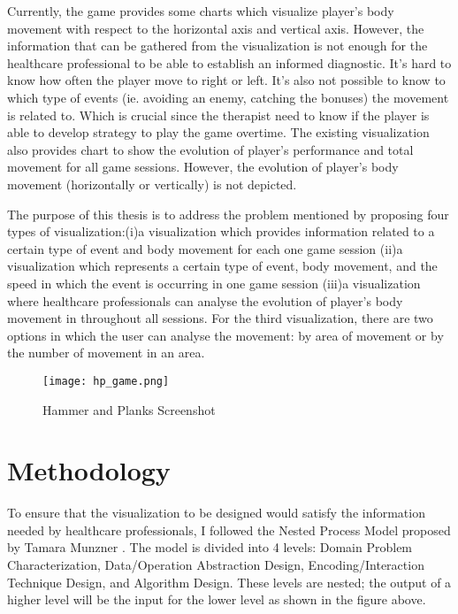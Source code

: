 Currently, the game provides some charts which visualize player's body movement with respect to the horizontal axis and vertical axis. However, the information that can be gathered from the visualization is not enough for the healthcare professional to be able to establish an informed diagnostic. It's hard to know how often the player move to right or left. It's also not possible to know to which type of events (ie. avoiding an enemy, catching the bonuses) the movement is related to. Which is crucial since the therapist need to know if the player is able to develop strategy to play the game overtime. The existing visualization also provides chart to show the evolution of player's performance and total movement for all game sessions. However, the evolution of player's body movement (horizontally or vertically) is not depicted.

The purpose of this thesis is to address the problem mentioned by proposing four types of visualization:(i)a visualization which provides information related to a certain type of event and body movement for each one game session (ii)a visualization which represents a certain type of event, body movement, and the speed in which the event is occurring in one game session (iii)a visualization where healthcare professionals can analyse the evolution of player's body movement in throughout all sessions. For the third visualization, there are two options in which the user can analyse the movement: by area of movement or by the number of movement in an area.

\begin{figure}
\centering
\texttt{[image: hp\_game.png]}
\caption{Hammer and Planks Screenshot \label{overflow}}
\end{figure}


\section{Methodology}

To ensure that the visualization to be designed would satisfy the information needed by healthcare professionals, I followed the Nested Process Model proposed by Tamara Munzner \cite{Munzner:2009:NMV:1638611.1639181}. The model is divided into 4 levels: Domain Problem Characterization, Data/Operation Abstraction Design, Encoding/Interaction Technique Design, and Algorithm Design. These levels are nested; the output of a higher level will be the input for the lower level as shown in the figure above.

